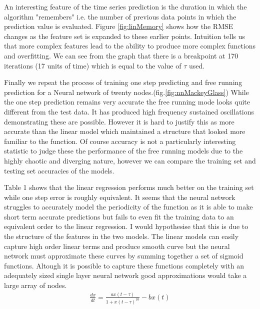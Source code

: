 \documentclass[a4paper,10pt, twocolumn]{article}
\begin{document}
An interesting feature of the time series prediction is the duration in which the algorithm "remembers" i.e. the number of previous data points in which the prediction value is evaluated. Figure \ref{fig:linMemory} shows how the RMSE changes as the feature set is expanded to these earlier points. Intuition tells us that more complex features lead to the ability to produce more complex functions and overfitting. We can see from the graph that there is a breakpoint at 170 iterations (17 units of time) which is equal to the value of $\tau$ used. 

Finally we repeat the process of training one step predicting and free running prediction for a Neural network of twenty nodes.(fig.\ref{fig:nnMackeyGlass}) While the one step prediction remains very accurate the free running mode looks quite different from the test data. It has produced high frequency sustained oscillations demonstrating these are possible. However it is hard to justify this as more accurate than the linear model which maintained a structure that looked more familiar to the function. Of course accuracy is not a particularly interesting statistic to judge these the performance of the free running models due to the highly chaotic and diverging nature, however we can compare the training set and testing set accuracies of the models. 

Table 1 shows that the linear regression performs much better on the training set while one step error is roughly equivalent. It seems that the neural network struggles to accurately model the periodicity of the function as it is able to make short term accurate predictions but fails to even fit the training data to an equivalent order to the linear regression. I would hypothesise that this is due to the structure of the features in the two models. The linear models can easily capture high order linear terms and produce smooth curve but the neural network must approximate these curves by summing together a set of sigmoid functions. Altough it is possible to capture these functions completely with an adequately sized single layer neural network good approximations would take a large array of nodes. 
\begin{align}
	\frac{dx}{dt}= \frac{ax(t-\tau)}{1+x(t-\tau)^{10}}-bx(t)
\end{align} 	
	
\end{document}
